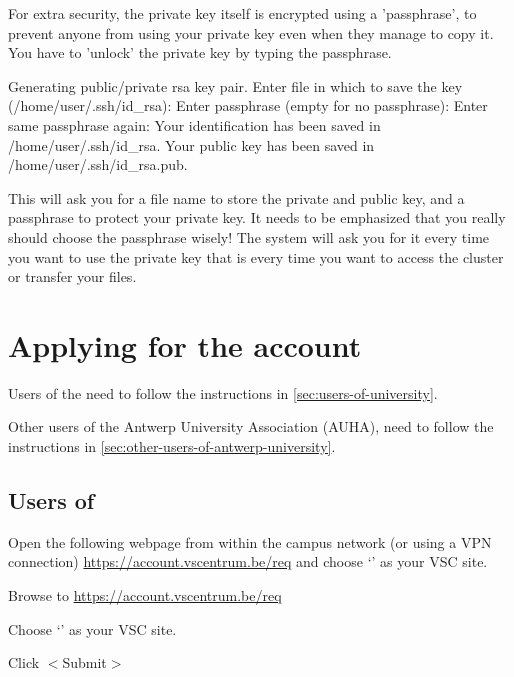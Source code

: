   For extra security, the private key itself is encrypted using a 'passphrase',
  to prevent anyone from using your private key even when they manage to copy
  it. You have to 'unlock' the private key by typing the passphrase.

\begin{prompt}
Generating public/private rsa key pair.
Enter file in which to save the key (/home/user/.ssh/id_rsa):
Enter passphrase (empty for no passphrase):
Enter same passphrase again:
Your identification has been saved in /home/user/.ssh/id_rsa.
Your public key has been saved in /home/user/.ssh/id_rsa.pub.
\end{prompt}

  This will ask you for a file name to store the private and public key, and a
  passphrase to protect your private key. It needs to be emphasized that you
  really should choose the passphrase wisely! The system will ask you for it
  every time you want to use the private key that is every time you want to
  access the cluster or transfer your files.


\fi

\section{Applying for the account}
\label{sec:applying-for-the-account}

Users of the \university need to follow the instructions in \autoref{sec:users-of-university}.

\ifantwerpen
Other users of the Antwerp University Association (AUHA), need to follow the
instructions in \autoref{sec:other-users-of-antwerp-university}.
\fi

\subsection{Users of \university}
\label{sec:users-of-university}

Open the following webpage from within the \university campus network (or using a VPN
connection) \url{https://account.vscentrum.be/req} and choose `\sitename' as your VSC
site.

Browse to \url{https://account.vscentrum.be/req}

Choose `\sitename' as your VSC site.

Click $<$Submit$>$


